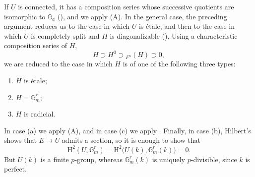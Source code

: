 If \(U\) is connected, it has a composition series whose
successive quotients are isomorphic to \(\mathbb G_a\)
(), and we apply (A).  In the general case, the
preceding argument reduces us to the case in which \(U\) is
étale, and then to the case in which \(U\) is completely split
and \(H\) is diagonalizable ().  Using a characteristic
composition series of \(H\),
\[
  H\supset H^0\supset{}_{F^n}(H)\supset0,
\]
we are reduced to the case in which \(H\) is of one of the
following three types:
\begin{enumerate}
\item[(a)] \(H\) is étale;
\item[(b)] \(H=\mathbb G_m^r\);
\item[(c)] \(H\) is radicial.
\end{enumerate}
In case (a) we apply (A), and in case (c) we apply .
Finally, in case (b), Hilbert's  shows that
\(E\longrightarrow U\) admits a section, so it is enough to show
that
\[
  \mathrm H^2(U,\mathbb G_m^r)
    =\mathrm H^2\bigl(U(k),\mathbb G_m^r(k)\bigr)=0.
\]
But \(U(k)\) is a finite \(p\)-group, whereas
\(\mathbb G_m^r(k)\) is uniquely \(p\)-divisible, since \(k\) is
perfect.


